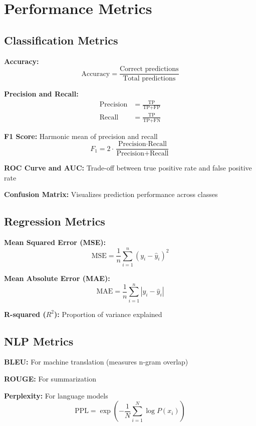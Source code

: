 
\section{Performance Metrics}
\label{sec:performance-metrics}

\subsection{Classification Metrics}

\textbf{Accuracy:}
\begin{equation}
\text{Accuracy} = \frac{\text{Correct predictions}}{\text{Total predictions}}
\end{equation}

\textbf{Precision and Recall:}
\begin{align}
\text{Precision} &= \frac{\text{TP}}{\text{TP} + \text{FP}} \\
\text{Recall} &= \frac{\text{TP}}{\text{TP} + \text{FN}}
\end{align}

\textbf{F1 Score:} Harmonic mean of precision and recall
\begin{equation}
F_1 = 2 \cdot \frac{\text{Precision} \cdot \text{Recall}}{\text{Precision} + \text{Recall}}
\end{equation}

\textbf{ROC Curve and AUC:} Trade-off between true positive rate and false positive rate

\textbf{Confusion Matrix:} Visualizes prediction performance across classes

\subsection{Regression Metrics}

\textbf{Mean Squared Error (MSE):}
\begin{equation}
\text{MSE} = \frac{1}{n} \sum_{i=1}^{n} (y_i - \hat{y}_i)^2
\end{equation}

\textbf{Mean Absolute Error (MAE):}
\begin{equation}
\text{MAE} = \frac{1}{n} \sum_{i=1}^{n} |y_i - \hat{y}_i|
\end{equation}

\textbf{R-squared ($R^2$):} Proportion of variance explained

\subsection{NLP Metrics}

\textbf{BLEU:} For machine translation (measures n-gram overlap)

\textbf{ROUGE:} For summarization

\textbf{Perplexity:} For language models
\begin{equation}
\text{PPL} = \exp\left(-\frac{1}{N} \sum_{i=1}^{N} \log P(x_i)\right)
\end{equation}

